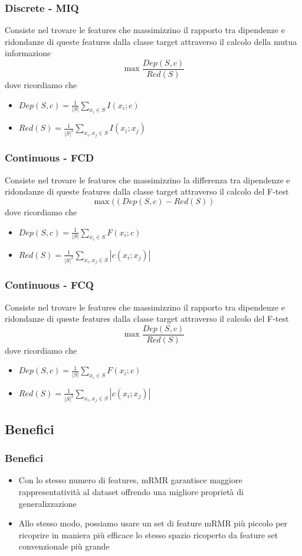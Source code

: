 \documentclass{beamer}
\begin{document}
\begin{frame}
	\frametitle{Discrete - MIQ}
	Consiste nel trovare le features che massimizzino il rapporto tra dipendenze e ridondanze di queste features dalla classe target attraverso il calcolo della mutua informazione
	$$\max\frac{Dep(S,c)}{Red(S)}$$
	dove ricordiamo che
	\begin{itemize}
		\item $Dep(S,c)= \frac{1}{|S|} \sum\limits_{x_i \in S} I (x_i;c)$
		\item $Red (S)= \frac{1}{|S|^2} \sum\limits_{x_i,x_j \in S} I (x_i;x_j)$
	\end{itemize}
\end{frame}
\begin{frame}
	\frametitle{Continuous - FCD}
	Consiste nel trovare le features che massimizzino la differenza tra dipendenze e ridondanze di queste features dalla classe target attraverso il calcolo del F-test
	$$\max((Dep(S,c) - Red(S))$$
	dove ricordiamo che
	\begin{itemize}
		\item $Dep(S,c)= \frac{1}{|S|} \sum\limits_{x_i \in S} F(x_i;c)$
		\item $Red(S)= \frac{1}{|S|^2} \sum\limits_{x_i,x_j \in S} |c (x_i;x_j)|$
	\end{itemize}
\end{frame}

\begin{frame}
	\frametitle{Continuous - FCQ}
	Consiste nel trovare le features che massimizzino il rapporto tra dipendenze e ridondanze di queste features dalla classe target attraverso il calcolo del F-test
	$$\max\frac{Dep(S,c)}{Red(S)}$$
	dove ricordiamo che
	\begin{itemize}
		\item $Dep(S,c)= \frac{1}{|S|} \sum\limits_{x_i \in S} F(x_i;c)$
		\item $Red(S)= \frac{1}{|S|^2} \sum\limits_{x_i,x_j \in S} |c (x_i;x_j)|$
	\end{itemize}
\end{frame}

\subsection{Benefici}
\begin{frame}
	\frametitle{Benefici}
	\begin{itemize}
		\item Con lo stesso numero di features, mRMR garantisce maggiore rappresentatività al dataset offrendo una migliore proprietà di generalizzazione
		\item Allo stesso modo, possiamo usare un set di feature mRMR più piccolo per ricoprire in maniera più efficace lo stesso spazio ricoperto da feature set convenzionale più grande
	\end{itemize}
\end{frame}
\end{document}
